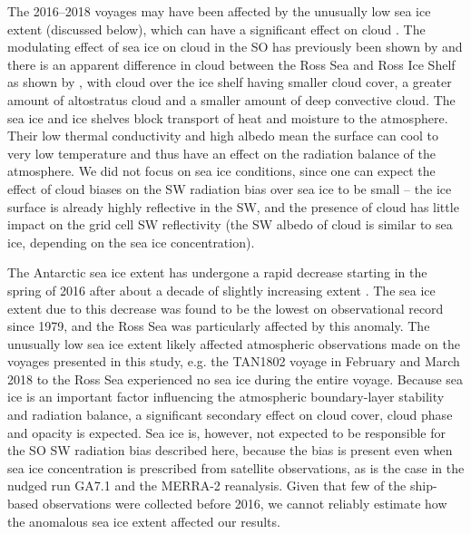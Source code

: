 The 2016--2018 voyages may have been affected by the unusually low sea ice
extent (discussed below), which can have a significant effect on cloud
\citep{frey2018,taylor2015}. The modulating effect of sea ice on cloud in the
SO has previously been shown by \cite{listowski2019} and there is an apparent
difference in cloud between the Ross Sea and Ross Ice Shelf as shown by
\cite{jolly2018}, with cloud over the ice shelf having smaller cloud cover, a
greater amount of altostratus cloud and a smaller amount of deep convective
cloud. The sea ice and ice shelves block transport of heat and moisture to the
atmosphere. Their low thermal conductivity and high albedo mean the surface can
cool to very low temperature and thus have an effect on the radiation balance
of the atmosphere. We did not focus on sea ice conditions, since one can expect
the effect of cloud biases on the SW radiation bias over sea ice to be small --
the ice surface is already highly reflective in the SW, and the presence of
cloud has little impact on the grid cell SW reflectivity (the SW albedo of
cloud is similar to sea ice, depending on the sea ice concentration).

The Antarctic sea ice extent has undergone a rapid decrease starting in the
spring of 2016 after about a decade of slightly increasing extent
\citep{turner2017,stuecker2017,doddridge2017,kusahara2018,schlosser2018,ludescher2018}.
The sea ice extent due to this decrease was found to be the lowest on
observational record since 1979, and the Ross Sea was particularly affected by
this anomaly. The unusually low sea ice extent likely affected atmospheric
observations made on the voyages presented in this study, e.g. the TAN1802
voyage in February and March 2018 to the Ross Sea experienced no sea ice during
the entire voyage. Because sea ice is an important factor influencing the
atmospheric boundary-layer stability and radiation balance, a significant
secondary effect on cloud cover, cloud phase and opacity is expected. Sea ice
is, however, not expected to be responsible for the SO SW radiation bias described
here, because the bias is present even when sea ice concentration is
prescribed from satellite observations, as is the case in the nudged run GA7.1
and the MERRA-2 reanalysis. Given that few of the ship-based
observations were collected before 2016, we cannot reliably estimate how
the anomalous sea ice extent affected our results. 


